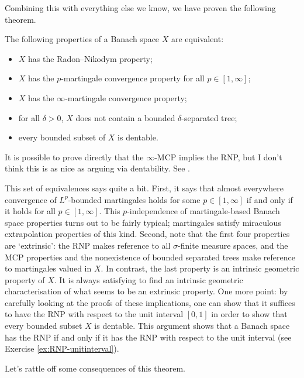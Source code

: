 Combining this with everything else we know, we have proven the following theorem.
\begin{thm}
  The following properties of a Banach space $X$ are equivalent:
  \begin{itemize}
  \item $X$ has the Radon--Nikodym property;
  \item $X$ has the $p$-martingale convergence property for all $p \in [1,\infty]$;
  \item $X$ has the $\infty$-martingale convergence property;
  \item for all $\delta > 0$, $X$ does not contain a bounded $\delta$-separated tree;
  \item every bounded subset of $X$ is dentable.
  \end{itemize}
\end{thm}

\begin{rmk}
  It is possible to prove directly that the $\infty$-MCP implies the RNP, but I don't think this is as nice as arguing via dentability.
  See \cite[Proof of Theorem 2.9]{gP16}.
\end{rmk}

This set of equivalences says quite a bit.
First, it says that almost everywhere convergence of $L^p$-bounded martingales holds for some $p \in [1,\infty]$ if and only if it holds for all $p \in [1,\infty]$.
This $p$-independence of martingale-based Banach space properties turns out to be fairly typical; martingales satisfy miraculous extrapolation properties of this kind.
Second, note that the first four properties are `extrinsic': the RNP makes reference to all $\sigma$-finite measure spaces, and the MCP properties and the nonexistence of bounded separated trees make reference to martingales valued in $X$.
In contrast, the last property is an intrinsic geometric property of $X$.
It is always satisfying to find an intrinsic geometric characterisation of what seems to be an extrinsic property.
One more point: by carefully looking at the proofs of these implications, one can show that it suffices to have the RNP with respect to the unit interval $[0,1]$ in order to show that every bounded subset $X$ is dentable.
This argument shows that a Banach space has the RNP if and only if it has the RNP with respect to the unit interval (see Exercise \ref{ex:RNP-unitinterval}).

Let's rattle off some consequences of this theorem.

